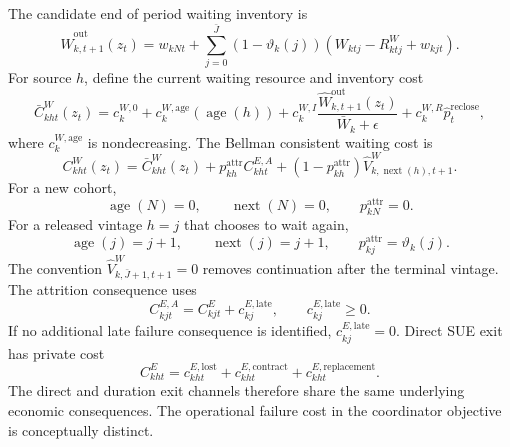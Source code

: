 \documentclass[a4paper,fleqn]{cas-sc}
\begin{document}
The candidate end of period waiting inventory is
\begin{equation}
 \widehat W^{\mathrm{out}}_{k,t+1}(z_t)=
 w_{kNt}+
 \sum_{j=0}^{\bar J}
 (1-\vartheta_k(j))
 \left(W_{ktj}-R^W_{ktj}+w_{kjt}\right).
 \label{eq:projected-waiting}
\end{equation}
For source $h$, define the current waiting resource and inventory cost
\begin{equation}
 \bar C^W_{kht}(z_t)=
 c^{W,0}_k+c^{W,\mathrm{age}}_k(\operatorname{age}(h))
 +c^{W,I}_k
 \frac{\widehat W^{\mathrm{out}}_{k,t+1}(z_t)}
 {\bar W_k+\epsilon}
 +c^{W,R}_k\widehat p^{\mathrm{reclose}}_t,
 \label{eq:waiting-resource-cost}
\end{equation}
where $c^{W,\mathrm{age}}_k$ is nondecreasing. The Bellman consistent waiting
cost is
\begin{equation}
 C^W_{kht}(z_t)=
 \bar C^W_{kht}(z_t)
 +p^{\mathrm{attr}}_{kh}C^{E,A}_{kht}
 +(1-p^{\mathrm{attr}}_{kh})
 \widehat V^W_{k,\operatorname{next}(h),t+1}.
 \label{eq:waiting-cost}
\end{equation}
For a new cohort,
\begin{equation}
 \operatorname{age}(N)=0,\qquad
 \operatorname{next}(N)=0,\qquad
 p^{\mathrm{attr}}_{kN}=0.
 \label{eq:new-source-age}
\end{equation}
For a released vintage $h=j$ that chooses to wait again,
\begin{equation}
 \operatorname{age}(j)=j+1,\qquad
 \operatorname{next}(j)=j+1,\qquad
 p^{\mathrm{attr}}_{kj}=\vartheta_k(j).
 \label{eq:old-source-age}
\end{equation}
The convention
$\widehat V^W_{k,\bar J+1,t+1}=0$ removes continuation after the terminal
vintage. The attrition consequence uses
\begin{equation}
 C^{E,A}_{kjt}=C^E_{kjt}+c^{E,\mathrm{late}}_{kj},
 \qquad c^{E,\mathrm{late}}_{kj}\ge0.
 \label{eq:attrition-consequence}
\end{equation}
If no additional late failure consequence is identified,
$c^{E,\mathrm{late}}_{kj}=0$. Direct SUE exit has private cost
\begin{equation}
 C^E_{kht}=
 c^{E,\mathrm{lost}}_{kht}
 +c^{E,\mathrm{contract}}_{kht}
 +c^{E,\mathrm{replacement}}_{kht}.
 \label{eq:exit-cost}
\end{equation}
The direct and duration exit channels therefore share the same underlying
economic consequences. The operational failure cost in the coordinator
objective is conceptually distinct.
\end{document}
